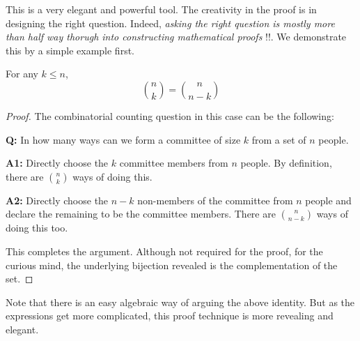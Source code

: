 This is a very elegant and powerful tool. The creativity in the proof is in designing the right question. Indeed, \textit{asking the right question is mostly more than half way thorugh into constructing mathematical proofs} !!.
We demonstrate this by a simple example first.

\begin{proposition}
For any $k \le n$,
$${n \choose k} = {n \choose n-k}$$
\end{proposition}
\begin{proof}
The combinatorial counting question in this case can be the following:
\begin{description}
\item{\bf Q:} In how many ways can we form a committee of size $k$ from a set of $n$ people.
\item{\bf A1:} Directly choose the $k$ committee members from $n$ people. By definition, there are ${n \choose k}$ ways of doing this.
\item{\bf  A2:} Directly choose the $n-k$ non-members of the committee from $n$ people and declare the remaining to be the committee members. There are ${n \choose n-k}$ ways of doing this too.
\end{description}
This completes the argument. Although not required for the proof, for the curious mind, the underlying bijection revealed is the complementation of the set.
\end{proof}

Note that there is an easy algebraic way of arguing the above identity. But as the expressions get more complicated, this proof technique is more revealing and elegant.

